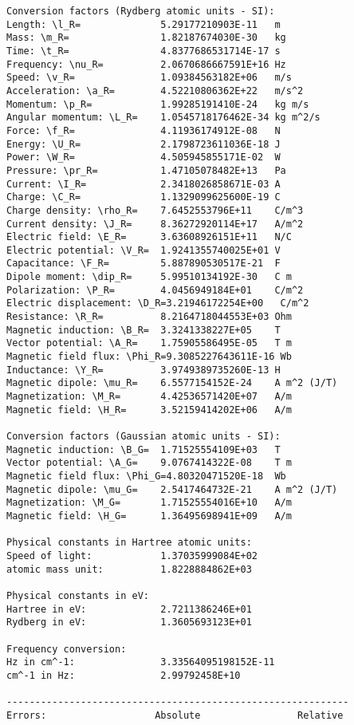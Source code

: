 \documentclass[12pt,a4paper,twoside]{report}
\begin{document}
{\begin{tcolorbox}
\begin{verbatim}
Conversion factors (Rydberg atomic units - SI):
Length: \l_R=              5.29177210903E-11   m
Mass: \m_R=                1.82187674030E-30   kg
Time: \t_R=                4.8377686531714E-17 s
Frequency: \nu_R=          2.0670686667591E+16 Hz
Speed: \v_R=               1.09384563182E+06   m/s
Acceleration: \a_R=        4.52210806362E+22   m/s^2
Momentum: \p_R=            1.99285191410E-24   kg m/s
Angular momentum: \L_R=    1.0545718176462E-34 kg m^2/s
Force: \f_R=               4.11936174912E-08   N
Energy: \U_R=              2.1798723611036E-18 J
Power: \W_R=               4.505945855171E-02  W
Pressure: \pr_R=           1.47105078482E+13   Pa
Current: \I_R=             2.3418026858671E-03 A
Charge: \C_R=              1.1329099625600E-19 C
Charge density: \rho_R=    7.6452553796E+11    C/m^3
Current density: \J_R=     8.36272920114E+17   A/m^2
Electric field: \E_R=      3.63608926151E+11   N/C
Electric potential: \V_R=  1.9241355740025E+01 V
Capacitance: \F_R=         5.887890530517E-21  F
Dipole moment: \dip_R=     5.99510134192E-30   C m
Polarization: \P_R=        4.0456949184E+01    C/m^2
Electric displacement: \D_R=3.21946172254E+00   C/m^2
Resistance: \R_R=          8.2164718044553E+03 Ohm
Magnetic induction: \B_R=  3.3241338227E+05    T
Vector potential: \A_R=    1.75905586495E-05   T m
Magnetic field flux: \Phi_R=9.3085227643611E-16 Wb
Inductance: \Y_R=          3.9749389735260E-13 H
Magnetic dipole: \mu_R=    6.5577154152E-24    A m^2 (J/T)
Magnetization: \M_R=       4.42536571420E+07   A/m
Magnetic field: \H_R=      3.52159414202E+06   A/m

Conversion factors (Gaussian atomic units - SI):
Magnetic induction: \B_G=  1.71525554109E+03   T
Vector potential: \A_G=    9.0767414322E-08    T m
Magnetic field flux: \Phi_G=4.80320471520E-18  Wb
Magnetic dipole: \mu_G=    2.5417464732E-21    A m^2 (J/T)
Magnetization: \M_G=       1.71525554016E+10   A/m
Magnetic field: \H_G=      1.36495698941E+09   A/m

Physical constants in Hartree atomic units:
Speed of light:            1.37035999084E+02
atomic mass unit:          1.8228884862E+03

Physical constants in eV:
Hartree in eV:             2.7211386246E+01
Rydberg in eV:             1.3605693123E+01

Frequency conversion:
Hz in cm^-1:               3.33564095198152E-11
cm^-1 in Hz:               2.99792458E+10

------------------------------------------------------------
Errors:                   Absolute                 Relative


\end{verbatim}
\end{tcolorbox}}
\end{document}
